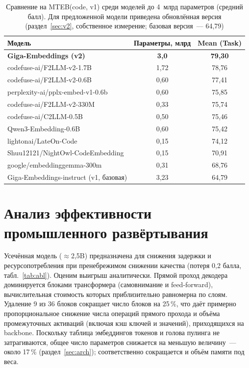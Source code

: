 \documentclass[12pt,a4paper]{article}
\begin{document}
\begin{table}[ht]
  \centering
  \caption{Сравнение на MTEB(code, v1) среди моделей до 4~млрд параметров
  (средний балл). Для предложенной модели приведена обновлённая версия
  (раздел~\ref{sec:v2}, собственное измерение; базовая версия~--- 64,79)}\label{tab:code}
  \begin{tabular}{lcc}
    \toprule
    Модель & Параметры, млрд & Mean (Task) \\
    \midrule
    \textbf{Giga-Embeddings (v2)}    & \textbf{3,0}  & \textbf{79,30} \\
    codefuse-ai/F2LLM-v2-1.7B        & 1,72 & 78,76 \\
    codefuse-ai/F2LLM-v2-0.6B        & 0,60 & 77,41 \\
    perplexity-ai/pplx-embed-v1-0.6b & 0,60 & 75,85 \\
    codefuse-ai/F2LLM-v2-330M        & 0,33 & 75,74 \\
    codefuse-ai/C2LLM-0.5B           & 0,50 & 75,46 \\
    Qwen3-Embedding-0.6B             & 0,60 & 75,42 \\
    lightonai/LateOn-Code            & 0,15 & 74,12 \\
    Shuu12121/NightOwl-CodeEmbedding & 0,15 & 70,91 \\
    google/embeddinggemma-300m       & 0,31 & 68,76 \\
    Giga-Embeddings-instruct (v1, базовая) & 3,23 & 64,79 \\
    \bottomrule
  \end{tabular}
\end{table}

\section{Анализ эффективности промышленного развёртывания}\label{sec:deploy}
Усечённая модель ($\approx$2{,}5B) предназначена для снижения задержки и
ресурсопотребления при пренебрежимом снижении качества (потеря 0{,}2 балла,
табл.~\ref{tab:abl}). Оценим выигрыш аналитически. Прямой проход декодера
доминируется блоками трансформера (самовнимание и feed-forward), вычислительная
стоимость которых приблизительно равномерна по слоям. Удаление 9 из 36 блоков
сокращает число блоков на 25\,\%, что даёт примерно пропорциональное снижение
числа операций прямого прохода и объёма промежуточных активаций (включая
кэш ключей и значений), приходящихся на backbone. Поскольку таблица эмбеддингов
токенов и голова пулинга не затрагиваются, общее число параметров снижается на
меньшую величину~--- около 17\,\% (раздел~\ref{sec:arch}); соответственно
сокращается и объём памяти под веса.
\end{document}
